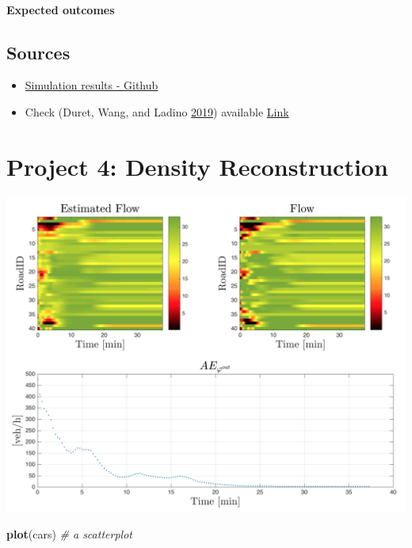 \documentclass[]{book}
\newenvironment{Shaded}{\begin{snugshade}}{\end{snugshade}}
\newcommand{\CommentTok}[1]{\textcolor[rgb]{0.56,0.35,0.01}{\textit{#1}}}
\newcommand{\KeywordTok}[1]{\textcolor[rgb]{0.13,0.29,0.53}{\textbf{#1}}}
\newcommand{\NormalTok}[1]{#1}
\theoremstyle{definition}
\theoremstyle{definition}
\theoremstyle{definition}
\theoremstyle{remark}
\begin{document}
\hypertarget{expected-outcomes-7}{%
\subsubsection*{Expected outcomes}\label{expected-outcomes-7}}

\hypertarget{sources-1}{%
\section*{Sources}\label{sources-1}}

\begin{itemize}
\item
  \href{https://github.com/aladinoster/density-reconstruction}{Simulation
  results - Github}
\item
  Check (Duret, Wang, and Ladino
  \protect\hyperlink{ref-Duret2019}{2019}) available
  \href{http://bit.ly/Hierarchical_ISTTT}{Link}
\end{itemize}

\hypertarget{project-4-density-reconstruction}{%
\chapter{Project 4: Density
Reconstruction}\label{project-4-density-reconstruction}}

\includegraphics{images/p4-01-density.png}




\begin{Shaded}
\begin{Highlighting}[]
\KeywordTok{plot}\NormalTok{(cars)  }\CommentTok{# a scatterplot}
\end{Highlighting}
\end{Shaded}
\end{document}
